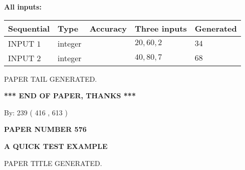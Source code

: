\documentclass[12pt]{article}
\begin{document}
   
   
   
\noindent\vspace{0.1in}\hspace{-0.08in} {\textbf{\Large{All inputs: }}}
   
   
  
  
\noindent\begin{tabular}{|l|l|l|l|l|}
\hline
 Sequential & Type & Accuracy & Three inputs & Generated \\ 
\hline
 
 
  INPUT $  1 $ & integer &  & $
 20
 , 
 60
 , 
 2
 $ & $ 34 $ 
 \\  \hline  
 
 
  INPUT $  2 $ & integer &  & $
 40
 , 
 80
 , 
 7
 $ & $ 68 $ 
 \\  \hline  
 \end{tabular}
   
   
   
   
   
   
 \vspace{0.2in}
 
   
   
\vspace{2.0in} PAPER TAIL GENERATED.
   
   
   
   
\vspace{1.0in} 
{\textbf{\large{ *** END OF PAPER, THANKS *** }}} 
   
   
\hspace{1.0in} By: 
 239 ( 416 ,  613 )
   
   
   
   
\newpage 
\setcounter{page}{ 
   576001 } 
   
   
   
   
 {\textbf{ \Large{ PAPER NUMBER  576  }}}
   
   
\vspace{0.2in}
   
   
   
   
   
   
   
   
 \vspace{0.2in}
{\LARGE {\textbf{ A QUICK TEST EXAMPLE}}}
   
   
 PAPER TITLE GENERATED.
   
   
   
\vspace{0.2in}
   
\end{document}
